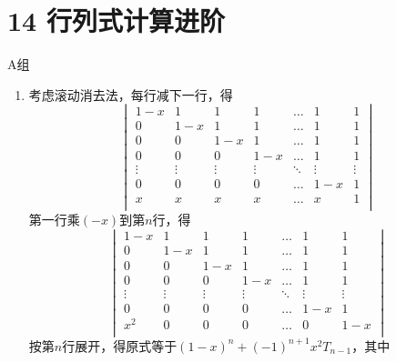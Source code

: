 \section*{14 行列式计算进阶}

\vspace{2ex}

\centerline{\heiti A组}
\begin{enumerate}
    \item 考虑滚动消去法，每行减下一行，得
          \[ \begin{vmatrix}
                  1-x    & 1      & 1      & 1      & \ldots & 1      & 1      \\
                  0      & 1-x    & 1      & 1      & \ldots & 1      & 1      \\
                  0      & 0      & 1-x    & 1      & \ldots & 1      & 1      \\
                  0      & 0      & 0      & 1-x    & \ldots & 1      & 1      \\
                  \vdots & \vdots & \vdots & \vdots & \ddots & \vdots & \vdots \\
                  0      & 0      & 0      & 0      & \ldots & 1-x    & 1      \\
                  x      & x      & x      & x      & \ldots & x      & 1      \\
              \end{vmatrix} \]
          第一行乘$(-x)$到第$n$行，得
          \[\begin{vmatrix}
                  1-x    & 1      & 1      & 1      & \ldots & 1      & 1      \\
                  0      & 1-x    & 1      & 1      & \ldots & 1      & 1      \\
                  0      & 0      & 1-x    & 1      & \ldots & 1      & 1      \\
                  0      & 0      & 0      & 1-x    & \ldots & 1      & 1      \\
                  \vdots & \vdots & \vdots & \vdots & \ddots & \vdots & \vdots \\
                  0      & 0      & 0      & 0      & \ldots & 1-x    & 1      \\
                  x^2    & 0      & 0      & 0      & \ldots & 0      & 1-x    \\
              \end{vmatrix}\]
          按第$n$行展开，得原式等于$(1-x)^n+(-1)^{n+1}x^2T_{n-1}$，其中

\end{enumerate}
